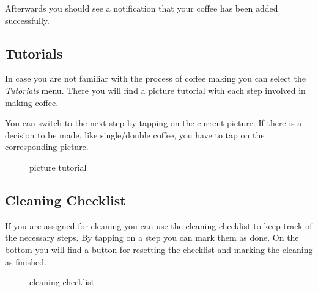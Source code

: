 Afterwards you should see a notification that your coffee has been added
successfully.

\subsection{Tutorials}\label{tutorials-1}

In case you are not familiar with the process of coffee making you can
select the \emph{Tutorials} menu. There you will find a picture tutorial
with each step involved in making coffee.

You can switch to the next step by tapping on the current picture. If
there is a decision to be made, like single/double coffee, you have to
tap on the corresponding picture.

\begin{figure}[htbp]
\centering
{}
\caption{picture tutorial}
\end{figure}

\subsection{Cleaning Checklist}\label{cleaning-checklist-1}

If you are assigned for cleaning you can use the cleaning checklist to
keep track of the necessary steps. By tapping on a step you can mark
them as done. On the bottom you will find a button for resetting the
checklist and marking the cleaning as finished.

\begin{figure}[htbp]
\centering
{}
\caption{cleaning checklist}
\end{figure}

